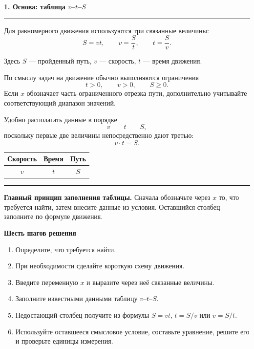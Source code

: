 \documentclass[a4paper,12pt]{article}
\newcommand{\sectiontitle}[1]{%
  \Needspace{6\baselineskip}%
  \vspace{0.25em}%
  {\Large\bfseries\color{darkaccent}#1}\par
  \vspace{0.25em}%
  \textcolor{rulegray}{\rule{\linewidth}{0.6pt}}%
  \vspace{0.35em}%
}
\newcommand{\subsectiontitle}[1]{%
  \Needspace{4\baselineskip}%
  \vspace{0.45em}%
  {\large\bfseries\color{darkaccent}#1}\par
  \vspace{0.15em}%
}
\newcommand{\important}[1]{%
  \par\vspace{0.2em}%
  \noindent
  \textcolor{accent}{\rule{2.4pt}{\baselineskip}}%
  \hspace{0.65em}%
  \begin{minipage}[t]{0.94\linewidth}
  #1
  \end{minipage}%
  \par\vspace{0.3em}%
}
\begin{document}
\sectiontitle{1. Основа: таблица \(v\)--\(t\)--\(S\)}

Для равномерного движения используются три связанные величины:
\[
\boxed{S=vt},
\qquad
\boxed{v=\frac{S}{t}},
\qquad
\boxed{t=\frac{S}{v}}.
\]

Здесь \(S\) --- пройденный путь, \(v\) --- скорость, \(t\) --- время движения.

По смыслу задач на движение обычно выполняются ограничения
\[
t>0,\qquad v>0,\qquad S\ge 0.
\]
Если \(x\) обозначает часть ограниченного отрезка пути, дополнительно учитывайте соответствующий диапазон значений.

Удобно располагать данные в порядке
\[
\boxed{v\qquad t\qquad S},
\]
поскольку первые две величины непосредственно дают третью:
\[
\boxed{v\cdot t=S}.
\]

\begin{center}
\renewcommand{\arraystretch}{1.35}
\begin{tabular}{@{}ccc@{}}
\toprule
Скорость & Время & Путь\\
\midrule
\(v\) & \(t\) & \(S\)\\
\bottomrule
\end{tabular}
\end{center}

\important{
\textbf{Главный принцип заполнения таблицы.}
Сначала обозначьте через \(x\) то, что требуется найти, затем внесите данные из условия.
Оставшийся столбец заполните по формуле движения.
}

\subsectiontitle{Шесть шагов решения}

\begin{enumerate}
  \item Определите, что требуется найти.
  \item При необходимости сделайте короткую схему движения.
  \item Введите переменную \(x\) и выразите через неё связанные величины.
  \item Заполните известными данными таблицу \(v\)--\(t\)--\(S\).
  \item Недостающий столбец получите из формулы \(S=vt\), \(t=S/v\) или \(v=S/t\).
  \item Используйте оставшееся смысловое условие, составьте уравнение, решите его и проверьте единицы измерения.
\end{enumerate}
\end{document}
